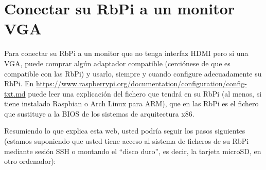 \section{Conectar su RbPi a un monitor VGA}\label{sec:rasp-vga}
Para conectar su RbPi a un monitor que no tenga interfaz HDMI pero si una VGA, puede comprar algún adaptador
compatible (cerciónese de que es compatible con las RbPi) y usarlo, siempre y cuando configure adecuadamente su
RbPi. En \url{https://www.raspberrypi.org/documentation/configuration/config-txt.md} puede leer una explicación
del fichero  que tendrá en su RbPi (al menos, si tiene instalado Raspbian o Arch Linux
para ARM), que en las RbPi es el fichero que sustituye a la BIOS de los sistemas de arquitectura x86.

Resumiendo lo que explica esta web, usted podría seguir los pasos siguientes (estamos suponiendo que usted tiene
acceso al sistema de ficheros de su RbPi mediante sesión SSH o montando el ``disco duro'', es decir, la tarjeta
microSD, en otro ordenador):

